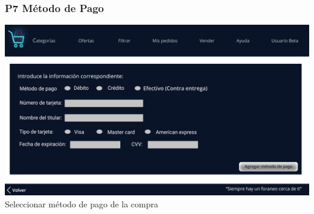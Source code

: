 \documentclass[14pt]{article}
\begin{document}
            \subsubsection{P7 Método de Pago}\label{P7 Método de Pago}
                \begin{center}
                    \includegraphics[height=0.55\textwidth]{MetodoDePago.jpg}
                    \label{fig:MetodoDePago} \\ [Figura 7] Seleccionar método de pago de la compra
                \end{center}
\end{document}
